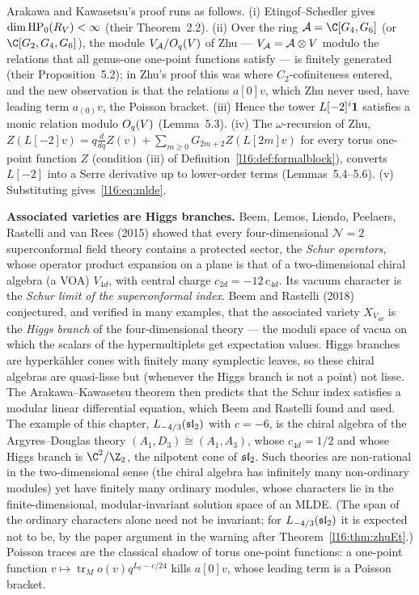Arakawa and Kawasetsu's proof runs as follows. (i) Etingof--Schedler gives
$\dim\mathrm{HP}_0(R_V)<\infty$ (their Theorem~2.2). (ii) Over the ring $\mathcal A = \C[G_4,G_6]$ (or
$\C[G_2,G_4,G_6]$), the module $V_{\mathcal A}/O_q(V)$ of Zhu --- $V_{\mathcal A} = \mathcal A\otimes V$ modulo
the relations that all genus-one one-point functions satisfy --- is finitely generated (their
Proposition~5.2); in Zhu's proof this was where $C_2$-cofiniteness entered, and the new observation is that the
relations $a[0]v$, which Zhu never used, have leading term $a_{(0)}v$, the Poisson bracket. (iii) Hence the
tower $L[-2]^i\mathbf{1}$ satisfies a monic relation modulo $O_q(V)$ (Lemma~5.3). (iv) The
$\omega$-recursion of Zhu, $Z(L[-2]v) = q\frac{d}{dq}Z(v) + \sum_{m\ge0}G_{2m+2}Z(L[2m]v)$ for every torus one-point
function $Z$ (condition (iii) of Definition~\ref{l16:def:formalblock}), converts $L[-2]$ into a Serre derivative up to lower-order terms (Lemmas~5.4--5.6). (v)
Substituting gives~\eqref{l16:eq:mlde}.

\begin{physics}
\textbf{Associated varieties are Higgs branches.} Beem, Lemos, Liendo, Peelaers, Rastelli and van Rees (2015)
showed that every four-dimensional $\mathcal N=2$ superconformal field theory contains a protected sector,
the \emph{Schur operators}, whose operator product expansion on a plane is that of a two-dimensional chiral
algebra (a VOA) $V_{4d}$, with central charge $c_{2d} = -12\,c_{4d}$. Its vacuum character is the \emph{Schur
limit of the superconformal index}. Beem and Rastelli (2018) conjectured, and verified in many examples,
that the associated variety $X_{V_{4d}}$ is the \emph{Higgs branch} of the four-dimensional theory --- the
moduli space of vacua on which the scalars of the hypermultiplets get expectation values. Higgs branches are
hyperk\"ahler cones with finitely many symplectic leaves, so these chiral algebras are quasi-lisse but (whenever
the Higgs branch is not a point) not lisse. The Arakawa--Kawasetsu theorem then predicts that the Schur index
satisfies a modular linear differential equation, which Beem and Rastelli found and used. The example of this
chapter, $L_{-4/3}(\mathfrak{sl}_2)$ with $c = -6$, is the chiral algebra of the Argyres--Douglas theory
$(A_1,D_3)\cong(A_1,A_3)$, whose $c_{4d} = 1/2$ and whose Higgs branch is $\C^2/\Z_2$, the nilpotent cone of
$\mathfrak{sl}_2$. Such theories are non-rational in the two-dimensional sense (the chiral algebra has infinitely
many non-ordinary modules) yet have finitely many ordinary modules, whose characters lie in the finite-dimensional,
modular-invariant solution space of an MLDE. (The span of the ordinary characters alone need not be invariant; for
$L_{-4/3}(\mathfrak{sl}_2)$ it is expected not to be, by the paper argument in the warning after
Theorem~\ref{l16:thm:zhuEt}.) Poisson traces are the classical shadow of torus one-point functions: a one-point function
$v\mapsto\operatorname{tr}_M o(v)q^{L_0-c/24}$ kills $a[0]v$, whose leading term is a Poisson bracket.
\end{physics}

